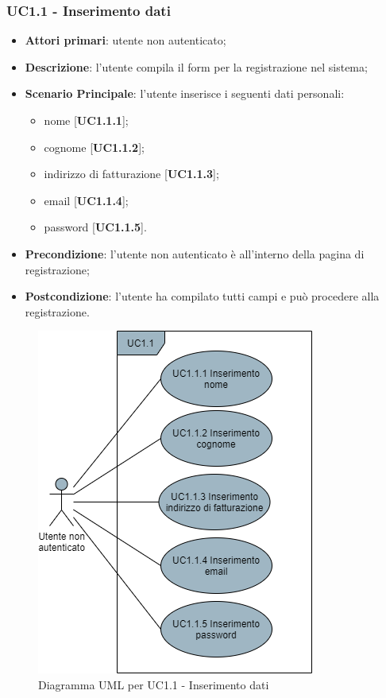 \subsubsection{UC1.1 - Inserimento dati}
\begin{itemize}
\item \textbf{Attori primari}: utente non autenticato;
\item \textbf{Descrizione}: l'utente compila il form per la registrazione nel sistema;
\item \textbf{Scenario Principale}: l'utente inserisce i seguenti dati personali:
\begin{itemize}
\item nome [\textbf{UC1.1.1}];
\item cognome [\textbf{UC1.1.2}];
\item indirizzo di fatturazione [\textbf{UC1.1.3}];
\item email [\textbf{UC1.1.4}];
\item password [\textbf{UC1.1.5}].
\end{itemize}
\item \textbf{Precondizione}: l'utente non autenticato è all'interno della pagina di registrazione;
\item \textbf{Postcondizione}: l'utente ha compilato tutti campi e può procedere alla registrazione.
\end{itemize}

\begin{figure}[H]
\centering
\includegraphics[scale=0.6]{res/UseCase/Immagini/InserimentoDatiRegistrazione}
\caption{Diagramma UML per UC1.1 - Inserimento dati}
\end{figure}


